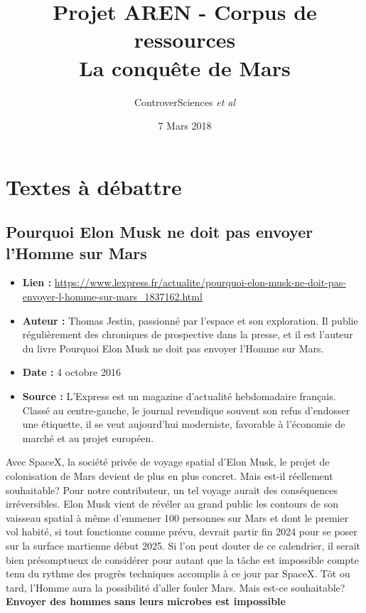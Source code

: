\documentclass[8pt]{article}
\author{ControverSciences\textit{ et al} }
\title{Projet AREN - Corpus de ressources \\  La conquête de Mars}
\date{7 Mars 2018}
\begin{document}
\maketitle

\tableofcontents

\newpage
\section{Textes à débattre}
\subsection{Pourquoi Elon Musk ne doit pas envoyer l'Homme sur Mars}
\begin{itemize}
	\item \textbf{Lien : }  \url{https://www.lexpress.fr/actualite/pourquoi-elon-musk-ne-doit-pas-envoyer-l-homme-sur-mars_1837162.html} 
	\item \textbf{Auteur : } Thomas Jestin, passionné par l'espace et son exploration. Il publie régulièrement des chroniques de prospective dans la presse, et il est l'auteur du livre Pourquoi Elon Musk ne doit pas envoyer l'Homme sur Mars.
	\item \textbf{Date : }  4 octobre 2016
	\item \textbf{Source : } L'Express est un magazine d'actualité hebdomadaire français. Classé au centre-gauche, le journal revendique souvent son refus d'endosser une étiquette, il se veut aujourd'hui moderniste, favorable à l'économie de marché et au projet européen.
\end{itemize}


Avec SpaceX, la société privée de voyage spatial d'Elon Musk, le projet de colonisation de Mars devient de plus en plus concret. Mais est-il réellement souhaitable? Pour notre contributeur, un tel voyage aurait des conséquences irréversibles. 
Elon Musk vient de révéler au grand public les contours de son vaisseau spatial à même d'emmener 100 personnes sur Mars et dont le premier vol habité, si tout fonctionne comme prévu, devrait partir fin 2024 pour se poser sur la surface martienne début 2025.  
Si l'on peut douter de ce calendrier, il serait bien présomptueux de considérer pour autant que la tâche est impossible compte tenu du rythme des progrès techniques accomplis à ce jour par SpaceX. Tôt ou tard, l'Homme aura la possibilité d'aller fouler Mars. Mais est-ce souhaitable?\\

\textbf{Envoyer des hommes sans leurs microbes est impossible}\\
\end{document}
